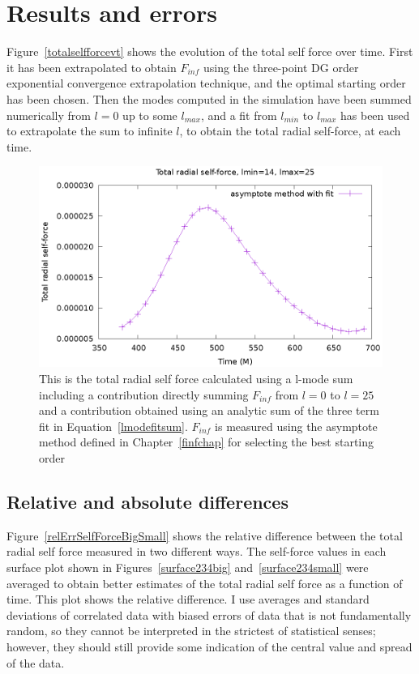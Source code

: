 \section{Results and errors}

Figure~\ref{totalselfforcevt} shows the evolution of the total self force over time. First it has been extrapolated to obtain $F_{inf}$ using the three-point DG order exponential convergence extrapolation technique, and the optimal starting order has been chosen. Then the modes computed in the simulation have been summed numerically from $l=0$ up to some $l_{max}$, and a fit from $l_{min}$ to $l_{max}$ has been used to extrapolate the sum to infinite $l$, to obtain the total radial self-force, at each time. 


\begin{figure}
  \includegraphics{totalselfforcevt2.eps}
  \caption{This is the total radial self force calculated using a l-mode sum including a contribution directly summing $F_{inf}$ from $l=0$ to $l=25$ and a contribution obtained using an analytic sum of the three term fit in Equation~\ref{lmodefitsum}. $F_{inf}$ is measured using the asymptote method defined in Chapter~\ref{finfchap} for selecting the best starting order}
\label{totalselfforcevt2}
\end{figure}


\subsection{Relative and absolute differences}

Figure~\ref{relErrSelfForceBigSmall} shows the relative difference between the total radial self force measured in two different ways. The self-force values in each surface plot shown in Figures~\ref{surface234big} and~\ref{surface234small} were averaged to obtain better estimates of the total radial self force as a function of time. This plot shows the relative difference. I use averages and standard deviations of correlated data with biased errors of data that is not fundamentally random, so they cannot be interpreted in the strictest of statistical senses; however, they should still provide some indication of the central value and spread of the data.

